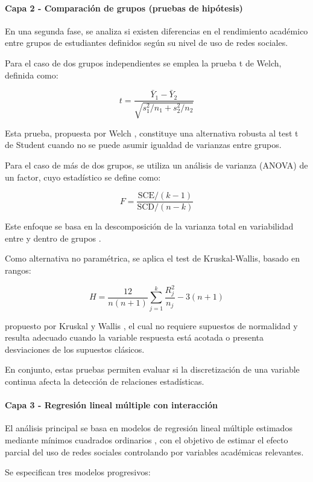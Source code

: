 \documentclass[12pt]{article}
\begin{document}
\paragraph{Capa 2 - Comparación de grupos (pruebas de hipótesis)}

En una segunda fase, se analiza si existen diferencias en el rendimiento académico entre grupos de estudiantes definidos según su nivel de uso de redes sociales.

Para el caso de dos grupos independientes se emplea la prueba t de Welch, definida como:

\[
t = \frac{\bar{Y}_1 - \bar{Y}_2}{\sqrt{s_1^2/n_1 + s_2^2/n_2}}
\]

Esta prueba, propuesta por Welch \cite{welch1947}, constituye una alternativa robusta al test t de Student cuando no se puede asumir igualdad de varianzas entre grupos.

Para el caso de más de dos grupos, se utiliza un análisis de varianza (ANOVA) de un factor, cuyo estadístico se define como:

\[
F = \frac{\text{SCE}/(k-1)}{\text{SCD}/(n-k)}
\]

Este enfoque se basa en la descomposición de la varianza total en variabilidad entre y dentro de grupos \cite{montgomery2014}.

Como alternativa no paramétrica, se aplica el test de Kruskal-Wallis, basado en rangos:

\[
H = \frac{12}{n(n+1)} \sum_{j=1}^{k} \frac{R_j^2}{n_j} - 3(n+1)
\]

propuesto por Kruskal y Wallis \cite{kruskalwallis1952}, el cual no requiere supuestos de normalidad y resulta adecuado cuando la variable respuesta está acotada o presenta desviaciones de los supuestos clásicos.

En conjunto, estas pruebas permiten evaluar si la discretización de una variable continua afecta la detección de relaciones estadísticas.

\paragraph{Capa 3 - Regresión lineal múltiple con interacción}

El análisis principal se basa en modelos de regresión lineal múltiple estimados mediante mínimos cuadrados ordinarios \cite{kutner2005}, con el objetivo de estimar el efecto parcial del uso de redes sociales controlando por variables académicas relevantes.

Se especifican tres modelos progresivos:
\end{document}
